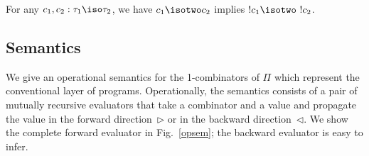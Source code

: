 \begin{proposition}
For any $c_1,c_2 : \tau_1 \iso \tau_2$, we have $c_1 \isotwo c_2$ implies
$!c_1 \isotwo ~!c_2$.
\end{proposition}

\subsection{Semantics}
\label{sec:pisem}

We give an operational semantics for the 1-combinators of $\Pi$ which
represent the conventional layer of programs.  Operationally, the
semantics consists of a pair of mutually recursive evaluators that
take a combinator and a value and propagate the value in the forward
direction~$\triangleright$ or in the backward
direction~$\triangleleft$. We show the complete forward evaluator in
Fig.~\ref{opsem}; the backward evaluator is easy to infer.

